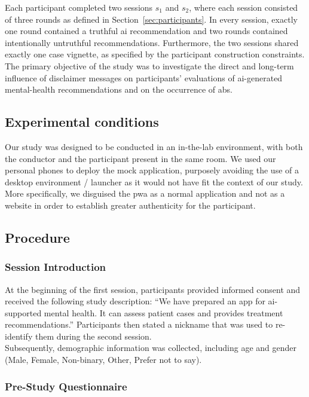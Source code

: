 \documentclass[sigconf,natbib=false]{acmart}
\begin{document}
Each participant completed two sessions \(s_1\) and \(s_2\), where each session consisted of three rounds as defined in Section~\ref{sec:participants}.
In every session, exactly one round contained a truthful \Gls{ai} recommendation and two rounds contained intentionally untruthful recommendations.
Furthermore, the two sessions shared exactly one case vignette, as specified by the participant construction constraints.
The primary objective of the study was to investigate the direct and long-term influence of disclaimer messages on participants' evaluations of \Gls{ai}-generated mental-health recommendations and on the occurrence of \acrfull{abs}.

\subsection{Experimental conditions}

Our study was designed to be conducted in an in-the-lab environment, with both the conductor and the participant present in the same room.
We used our personal phones to deploy the mock application, purposely avoiding the use of a desktop environment / launcher as it would not have fit the context of our study.
More specifically, we disguised the \Gls{pwa} as a normal application and not as a website in order to establish greater authenticity for the participant.


\subsection{Procedure}
\label{sec:procedure}

\subsubsection{Session Introduction}

At the beginning of the first session, participants provided informed consent and received the following study description:
\enquote{We have prepared an app for \gls{ai}-supported mental health.
It can assess patient cases and provides treatment recommendations.}
Participants then stated a nickname that was used to re-identify them during the second session.\\
Subsequently, demographic information was collected, including age and gender (Male, Female, Non-binary, Other, Prefer not to say).

\subsubsection{Pre-Study Questionnaire}
\end{document}
